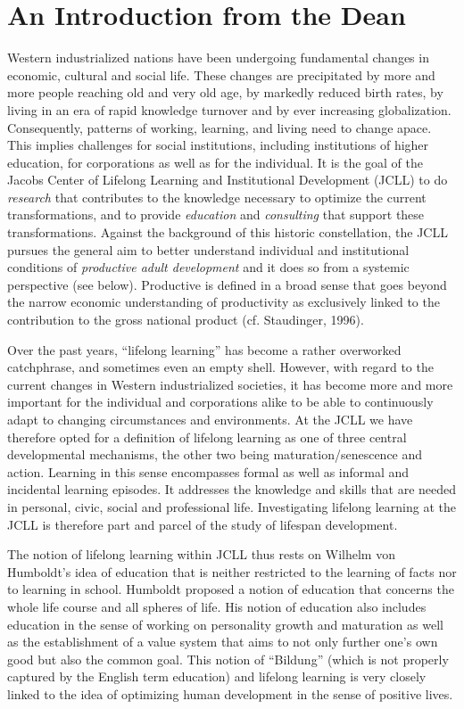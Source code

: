 \section{An Introduction from the Dean} 

Western industrialized nations have been undergoing fundamental changes in economic, cultural and social life. These changes are precipitated by more and more people reaching old and very old age, by markedly reduced birth rates, by living in an era of rapid knowledge turnover and by ever increasing globalization. Consequently, patterns of working, learning, and living need to change apace. This implies challenges for social institutions, including institutions of higher education, for corporations as well as for the individual. It is the goal of the Jacobs Center of Lifelong Learning and Institutional Development (JCLL) to do \textit{research} that contributes to the knowledge necessary to optimize the current transformations, and to provide \textit{education} and \textit{consulting} that support these transformations. Against the background of this historic constellation, the JCLL pursues the general aim to better understand individual and institutional conditions of \textit{productive adult development} and it does so from a systemic perspective (see below). Productive is defined in a broad sense that goes beyond the narrow economic understanding of productivity as exclusively linked to the contribution to the gross national product (cf. Staudinger, 1996).

Over the past years, ``lifelong learning'' has become a rather overworked catchphrase, and sometimes even an empty shell. However, with regard to the current changes in Western industrialized societies, it has become more and more important for the individual and corporations alike to be able to continuously adapt to changing circumstances and environments. At the JCLL we have therefore opted for a definition of lifelong learning as one of three central developmental mechanisms, the other two being maturation/senescence and action. Learning in this sense encompasses formal as well as informal and incidental learning episodes. It addresses the knowledge and skills that are needed in personal, civic, social and professional life. Investigating lifelong learning at the JCLL is therefore part and parcel of the study of lifespan development. 


The notion of lifelong learning within JCLL thus rests on Wilhelm von Humboldt's idea of education that is neither restricted to the learning of facts nor to learning in school. Humboldt proposed a notion of education that concerns the whole life course and all spheres of life. His notion of education also includes education in the sense of working on personality growth and maturation as well as the establishment of a value system that aims to not only further one's own good but also the common goal. This notion of ``Bildung'' (which is not properly captured by the English term education) and lifelong learning is very closely linked to the idea of optimizing human development in the sense of positive lives.
\enlargethispage*{0.2cm}

